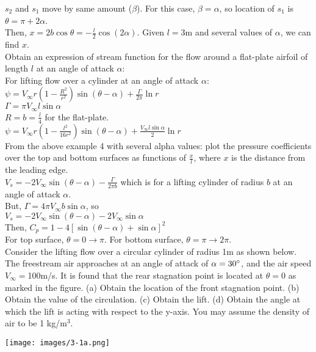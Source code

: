 \documentclass[12pt, twocolumn, letterpaper]{article}
\begin{document}
$s_2$ and $s_1$ move by same amount ($\beta$). For this case, $\beta=\alpha$, so location of $s_1$ is $\theta=\pi+2\alpha$.\\
Then, $x=2b\cos\theta=-\frac{l}{2}\cos(2\alpha)$. Given $l=3\text{m}$ and several values of $\alpha$, we can find $x$.\\
\hline
Obtain an expression of stream function for the flow around a flat-plate airfoil of length $l$ at an angle of attack $\alpha$:\\
For lifting flow over a cylinder at an angle of attack $\alpha$:\\
$\psi=V_\infty r\left(1-\frac{R^2}{r^2}\right)\sin(\theta-\alpha)+\frac{\Gamma}{2\pi}\ln r$\\
$\Gamma=\pi V_\infty l\sin\alpha$\\
$R=b=\frac{l}{4}$ for the flat-plate.\\
$\psi=V_\infty r \left(1-\frac{l^2}{16r^2}\right)\sin(\theta-\alpha)+\frac{V_\infty l\sin\alpha}{2}\ln r$\\
\hline
From the above example 4 with several alpha values: plot the pressure coefficients over the top and bottom surfaces as functions of $\frac{x}{l}$, where $x$ is the distance from the leading edge.\\
$V_s=-2V_\infty\sin(\theta-\alpha)-\frac{\Gamma}{2\pi b}$ which is for a lifting cylinder of radius $b$ at an angle of attack $\alpha$.\\
But, $\Gamma=4\pi V_\infty b\sin\alpha$, so\\
$V_s=-2V_\infty\sin(\theta-\alpha)-2V_\infty\sin\alpha$\\
Then, $C_p=1-4\left[\sin(\theta-\alpha)+\sin\alpha\right]^2$\\
For top surface, $\theta=0\to\pi$. For bottom surface, $\theta=\pi\to2\pi$.\\
\hline
Consider the lifting flow over a circular cylinder of radius 1m as shown below. The freestream air approaches at an angle of attack of $\alpha=30\degree$, and the air speed $V_\infty=$100m/s. It is found that the rear stagnation point is located at $\theta=0$ as marked in the figure. (a) Obtain the location of the front stagnation point. (b) Obtain the value of the circulation. (c) Obtain the lift. (d) Obtain the angle at which the lift is acting with respect to the y-axis. You may assume the density of air to be 1 kg/m$^3$.\\
\begin{center}
    \texttt{[image: images/3-1a.png]}
\end{center}
\end{document}
